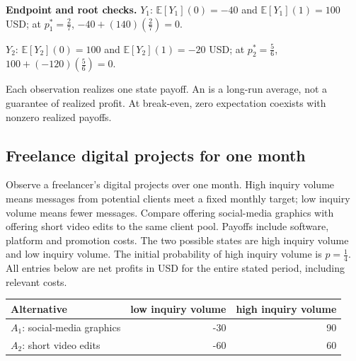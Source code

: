 \textbf{Endpoint and root checks.} $Y_1$: $\mathbb E[Y_1](0)=-40$ and $\mathbb E[Y_1](1)=100$ USD; at $p_1^*=\frac{2}{7}$, $-40+(140)(\frac{2}{7})=0$.

$Y_2$: $\mathbb E[Y_2](0)=100$ and $\mathbb E[Y_2](1)=-20$ USD; at $p_2^*=\frac{5}{6}$, $100+(-120)(\frac{5}{6})=0$.

Each observation realizes one state payoff. An  is a long-run average,
not a guarantee of realized profit. At break-even, zero expectation coexists with nonzero realized payoffs.
\clearpage
\subsection{Freelance digital projects for one month}\label{prob:c3-energy}
Observe a freelancer's digital projects over one month. High inquiry volume means messages from potential clients meet a fixed monthly target; low inquiry volume means fewer messages. Compare offering social-media graphics with offering short video edits to the same client pool. Payoffs include software, platform and promotion costs. The two possible states are high inquiry volume and low inquiry volume. The initial probability of high inquiry volume is $p=\frac{1}{4}$. All entries below are net profits in USD for the entire stated period, including relevant costs.
\begin{center}\begin{tabular}{lrr}\toprule Alternative & low inquiry volume & high inquiry volume\\\midrule
$A_1$: social-media graphics & -30 & 90\\
$A_2$: short video edits & -60 & 60\\
\bottomrule\end{tabular}\end{center}
